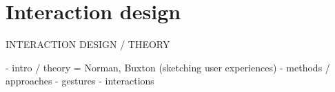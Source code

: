 


\section{Interaction design}
INTERACTION DESIGN / THEORY

- intro / theory = Norman, Buxton (sketching user experiences)
- methods / approaches
- gestures
- interactions
